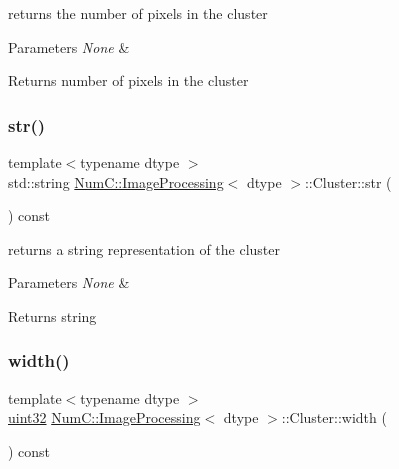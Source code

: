 returns the number of pixels in the cluster


\begin{DoxyParams}{Parameters}
{\em None} & \\
\hline
\end{DoxyParams}
\begin{DoxyReturn}{Returns}
number of pixels in the cluster 
\end{DoxyReturn}
\mbox{\label{class_num_c_1_1_image_processing_1_1_cluster_a753a4cb019060eb265cd23c95ca7949c}} 
\subsubsection{\texorpdfstring{str()}{str()}}
{\footnotesize\ttfamily template$<$typename dtype $>$ \\
std\+::string \mbox{\hyperlink{class_num_c_1_1_image_processing}{Num\+C\+::\+Image\+Processing}}$<$ dtype $>$\+::Cluster\+::str (\begin{DoxyParamCaption}{ }\end{DoxyParamCaption}) const\hspace{0.3cm}{\ttfamily [inline]}}

returns a string representation of the cluster


\begin{DoxyParams}{Parameters}
{\em None} & \\
\hline
\end{DoxyParams}
\begin{DoxyReturn}{Returns}
string 
\end{DoxyReturn}
\mbox{\label{class_num_c_1_1_image_processing_1_1_cluster_ab6375f422745940b6df0cd9a888388a2}} 
\subsubsection{\texorpdfstring{width()}{width()}}
{\footnotesize\ttfamily template$<$typename dtype $>$ \\
\mbox{\hyperlink{namespace_num_c_ae685802ca6d3035f2b400b081e3953fa}{uint32}} \mbox{\hyperlink{class_num_c_1_1_image_processing}{Num\+C\+::\+Image\+Processing}}$<$ dtype $>$\+::Cluster\+::width (\begin{DoxyParamCaption}{ }\end{DoxyParamCaption}) const\hspace{0.3cm}{\ttfamily [inline]}}


